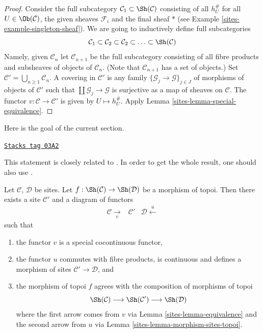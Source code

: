 \begin{proof}

Consider the full subcategory
$\mathcal{C}_1 \subset \Sh(\mathcal{C})$ consisting of all
$h_U^\#$ for all $U \in \Ob(\mathcal{C})$, the given sheaves
$\mathcal{F}_i$ and the final sheaf $*$ (see
Example \ref{sites-example-singleton-sheaf}). We are going to inductively
define full subcategories
$$
\mathcal{C}_1 \subset \mathcal{C}_2 \subset \mathcal{C}_2 \subset \ldots
\subset \Sh(\mathcal{C})
$$
Namely, given $\mathcal{C}_n$ let $\mathcal{C}_{n + 1}$ be the full
subcategory consisting of all fibre products and subsheaves of objects
of $\mathcal{C}_n$. (Note that $\mathcal{C}_{n + 1}$ has a set
of objects.) Set
$\mathcal{C}' = \bigcup_{n \geq 1} \mathcal{C}_n$.
A covering in $\mathcal{C}'$ is any family
$\{\mathcal{G}_j \to \mathcal{G}\}_{j \in J}$ of morphisms of objects
of $\mathcal{C}'$ such that
$\coprod \mathcal{G}_j \to \mathcal{G}$ is surjective
as a map of sheaves on $\mathcal{C}$.
The functor $v : \mathcal{C} \to \mathcal{C'}$ is given by
$U \mapsto h_U^\#$. Apply
Lemma \ref{sites-lemma-special-equivalence}.
\end{proof}

Here is the goal of the current section.

\begin{lemma}
\label{sites-lemma-morphism-topoi-comes-from-morphism-sites}
\href{https://stacks.math.columbia.edu/tag/03A2}{\texttt{Stacks tag 03A2}}

\begin{reference}
This statement is closely related to
\cite[Proposition 4.9.4. Expos\'e IV]{SGA4}.
In order to get the whole result, one should also use
\cite[Remarque 4.7.4, Expos\'e IV]{SGA4}.
\end{reference}
Let $\mathcal{C}$, $\mathcal{D}$ be sites.
Let $f : \Sh(\mathcal{C}) \to \Sh(\mathcal{D})$ be a
morphism of topoi.
Then there exists a site $\mathcal{C}'$ and a diagram of functors
$$
\begin{array}{ccc}\mathcal{C} \underset{v}{\longrightarrow} & \mathcal{C}' & \mathcal{D} \overset{u}{\longleftarrow}\end{array}
$$
such that
\begin{enumerate}
\item the functor $v$ is a special cocontinuous functor,
\item the functor $u$ commutes with fibre products, is
continuous and defines a morphism of sites
$\mathcal{C}' \to \mathcal{D}$, and
\item the morphism of topoi $f$ agrees with the composition
of morphisms of topoi
$$
\Sh(\mathcal{C}) \longrightarrow
\Sh(\mathcal{C}') \longrightarrow
\Sh(\mathcal{D})
$$
where the first arrow comes from $v$ via Lemma \ref{sites-lemma-equivalence}
and the second arrow from $u$ via Lemma \ref{sites-lemma-morphism-sites-topoi}.
\end{enumerate}
\end{lemma}

